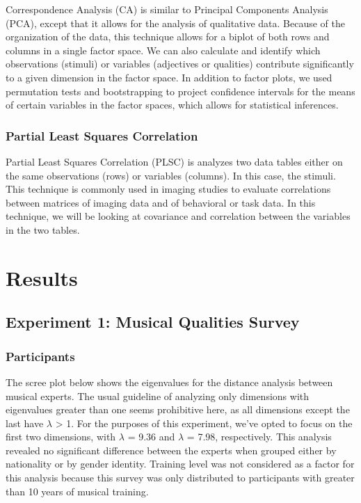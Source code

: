 \documentclass[
  english,
  man]{apa6}
\begin{document}
Correspondence Analysis (CA) is similar to Principal Components Analysis (PCA), except that it allows for the analysis of qualitative data. Because of the organization of the data, this technique allows for a biplot of both rows and columns in a single factor space. We can also calculate and identify which observations (stimuli) or variables (adjectives or qualities) contribute significantly to a given dimension in the factor space. In addition to factor plots, we used permutation tests and bootstrapping to project confidence intervals for the means of certain variables in the factor spaces, which allows for statistical inferences.

\hypertarget{partial-least-squares-correlation}{%
\subsubsection{Partial Least Squares Correlation}\label{partial-least-squares-correlation}}

Partial Least Squares Correlation (PLSC) is analyzes two data tables either on the same observations (rows) or variables (columns). In this case, the stimuli. This technique is commonly used in imaging studies to evaluate correlations between matrices of imaging data and of behavioral or task data. In this technique, we will be looking at covariance and correlation between the variables in the two tables.

\hypertarget{results}{%
\section{Results}\label{results}}

\hypertarget{experiment-1-musical-qualities-survey}{%
\subsection{Experiment 1: Musical Qualities Survey}\label{experiment-1-musical-qualities-survey}}

\hypertarget{participants-1}{%
\subsubsection{Participants}\label{participants-1}}

The scree plot below shows the eigenvalues for the distance analysis between musical experts. The usual guideline of analyzing only dimensions with eigenvalues greater than one seems prohibitive here, as all dimensions except the last have \(\lambda\) \textgreater{} 1. For the purposes of this experiment, we've opted to focus on the first two dimensions, with \(\lambda\) = 9.36 and \(\lambda\) = 7.98, respectively. This analysis revealed no significant difference between the experts when grouped either by nationality or by gender identity. Training level was not considered as a factor for this analysis because this survey was only distributed to participants with greater than 10 years of musical training.
\end{document}
